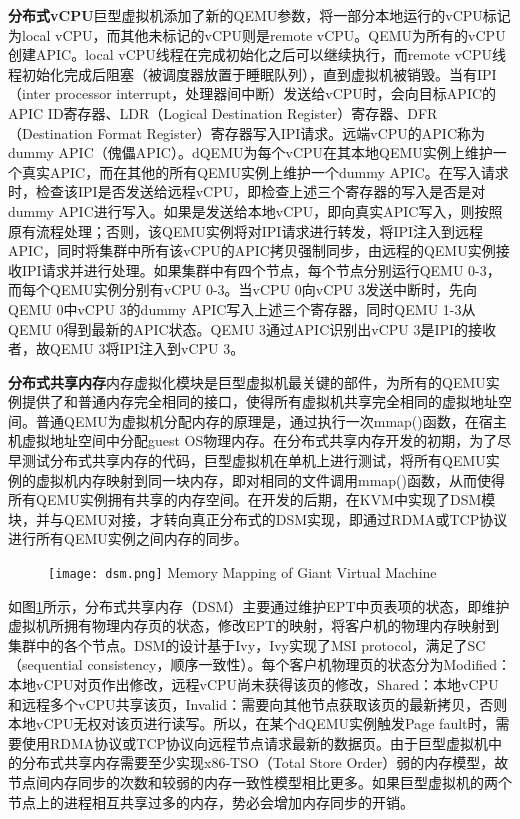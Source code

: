 \noindent\textbf{分布式vCPU}\quad 巨型虚拟机添加了新的QEMU参数，将一部分本地运行的vCPU标记为local vCPU，而其他未标记的vCPU则是remote vCPU。QEMU为所有的vCPU创建APIC。local vCPU线程在完成初始化之后可以继续执行，而remote vCPU线程初始化完成后阻塞（被调度器放置于睡眠队列），直到虚拟机被销毁。当有IPI（inter processor interrupt，处理器间中断）发送给vCPU时，会向目标APIC的APIC ID寄存器、LDR（Logical Destination Register）寄存器、DFR（Destination Format Register）寄存器写入IPI请求。远端vCPU的APIC称为dummy APIC（傀儡APIC）。dQEMU为每个vCPU在其本地QEMU实例上维护一个真实APIC，而在其他的所有QEMU实例上维护一个dummy APIC。在写入请求时，检查该IPI是否发送给远程vCPU，即检查上述三个寄存器的写入是否是对dummy APIC进行写入。如果是发送给本地vCPU，即向真实APIC写入，则按照原有流程处理；否则，该QEMU实例将对IPI请求进行转发，将IPI注入到远程APIC，同时将集群中所有该vCPU的APIC拷贝强制同步，由远程的QEMU实例接收IPI请求并进行处理。如果集群中有四个节点，每个节点分别运行QEMU 0-3，而每个QEMU实例分别有vCPU 0-3。当vCPU 0向vCPU 3发送中断时，先向QEMU 0中vCPU 3的dummy APIC写入上述三个寄存器，同时QEMU 1-3从QEMU 0得到最新的APIC状态。QEMU 3通过APIC识别出vCPU 3是IPI的接收者，故QEMU 3将IPI注入到vCPU 3。

\noindent\textbf{分布式共享内存}\quad 内存虚拟化模块是巨型虚拟机最关键的部件，为所有的QEMU实例提供了和普通内存完全相同的接口，使得所有虚拟机共享完全相同的虚拟地址空间。普通QEMU为虚拟机分配内存的原理是，通过执行一次mmap()函数，在宿主机虚拟地址空间中分配guest OS物理内存。在分布式共享内存开发的初期，为了尽早测试分布式共享内存的代码，巨型虚拟机在单机上进行测试，将所有QEMU实例的虚拟机内存映射到同一块内存，即对相同的文件调用mmap()函数，从而使得所有QEMU实例拥有共享的内存空间。在开发的后期，在KVM中实现了DSM模块，并与QEMU对接，才转向真正分布式的DSM实现，即通过RDMA或TCP协议进行所有QEMU实例之间内存的同步。

\label{chap:DSM}
\begin{figure}[!htp]
  \centering
  \texttt{[image: dsm.png]}
    {Memory Mapping of Giant Virtual Machine}
  \label{fig:DSM}
\end{figure}

如图\ref{fig:DSM}所示，分布式共享内存（DSM）主要通过维护EPT中页表项的状态，即维护虚拟机所拥有物理内存页的状态，修改EPT的映射，将客户机的物理内存映射到集群中的各个节点。DSM的设计基于Ivy\cite{ivy}，Ivy实现了MSI protocol，满足了SC（sequential consistency，顺序一致性）。每个客户机物理页的状态分为Modified：本地vCPU对页作出修改，远程vCPU尚未获得该页的修改，Shared：本地vCPU和远程多个vCPU共享该页，Invalid：需要向其他节点获取该页的最新拷贝，否则本地vCPU无权对该页进行读写。所以，在某个dQEMU实例触发Page fault时，需要使用RDMA协议或TCP协议向远程节点请求最新的数据页。由于巨型虚拟机中的分布式共享内存需要至少实现x86-TSO（Total Store Order）\cite{tso}弱的内存模型，故节点间内存同步的次数和较弱的内存一致性模型相比更多。如果巨型虚拟机的两个节点上的进程相互共享过多的内存，势必会增加内存同步的开销。

